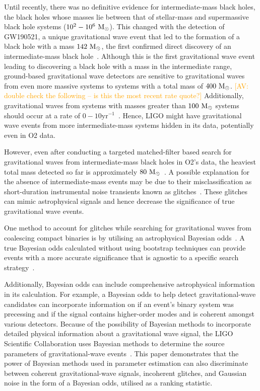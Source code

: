 \documentclass[%
 nofootinbib,
 amsmath,amssymb,
 aps,
 twocolumn
]{revtex4-2}
\newcommand{\mathcmd}[1]{{\sc \relax\ifmmode#1\else $#1$\fi}\xspace}
\newcommand{\msun}{\mathcmd{\text{M}_\odot}}
\newcommand{\av}[1]{\textcolor{orange}{[AV: #1]}}
\begin{document}
Until recently, there was no definitive evidence for intermediate-mass black holes, the black holes whose masses lie between that of stellar-mass and supermassive black hole systems ($10^2-10^6\ \msun$). This changed with the detection of GW190521, a unique gravitational wave event that led to the formation of a black hole with a mass  $142\ \msun$, the first confirmed direct discovery of an intermediate-mass black hole~\cite{gw190521}. Although this is the first gravitational wave event leading to discovering a black hole with a mass in the intermediate range, ground-based gravitational wave detectors are sensitive to gravitational waves from even more massive systems to systems with a total mass of $400\ \msun$. \av{double check the following -- is this the most recent rate quote?} Additionally, gravitational waves from systems with masses greater than $100\ \msun$ systems should occur at a rate of $0-10\text{yr}^{-1}$~\cite{fregeau2006imbhbRatePrediction, mandel2008rates,rodriguez2015bbhRatePredictions,ligo_imbh_search}. Hence, LIGO might have gravitational wave events from more intermediate-mass systems hidden in its data, potentially even in O2 data.

However, even after conducting a targeted matched-filter based search for gravitational waves from intermediate-mass black holes in O2's data, the heaviest total mass detected so far is approximately $80\ \msun$~\cite{GWTC1,imbhbSearch2014, ligo_imbh_search}. A possible explanation for the absence of intermediate-mass events may be due to their misclassification as short-duration instrumental noise transients known as glitches~\cite{ pycbc_short_duration_transients, pe_with_glitch, blip_glitches}. These glitches can mimic astrophysical signals and hence decrease the significance of true gravitational wave events. 

One method to account for glitches while searching for gravitational waves from coalescing compact binaries is by utilising an astrophysical Bayesian odds~\cite{bci, BCR1, BCR2, bcr_gw151216, bayesian_odds}. A true Bayesian odds calculated without using bootstrap techniques can provide events with a more accurate significance that is agnostic to a specific search strategy~\cite{BCR2, bcr_gw151216,  bayesian_odds}. 

Additionally, Bayesian odds can include comprehensive astrophysical information in its calculation. For example, a Bayesian odds to help detect gravitational-wave candidates can incorporate information on if an event's binary system was precessing and if the signal contains higher-order modes and is coherent amongst various detectors. Because of the possibility of Bayesian methods to incorporate detailed physical information about a gravitational wave signal, the LIGO Scientific Collaboration uses Bayesian methods to determine the source parameters of gravitational-wave events~\cite{abbott2016ligo, GWTC1}. This paper demonstrates that the power of Bayesian methods used in parameter estimation can also discriminate between coherent gravitational-wave signals, incoherent glitches, and Gaussian noise in the form of a Bayesian odds, utilised as a ranking statistic. 
\end{document}
